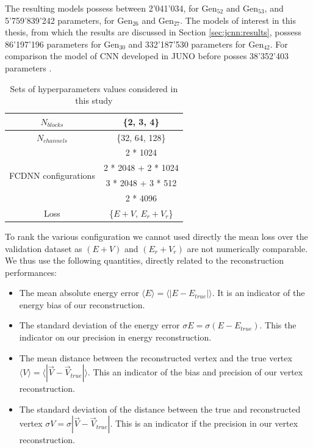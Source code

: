 \documentclass[../main.tex]{subfiles}
\begin{document}
\hfill

The resulting models possess between 2'041'034, for $\mathrm{Gen}_{52}$ and $\mathrm{Gen}_{53}$, and  5'759'839'242 parameters, for $\mathrm{Gen}_{26}$ and $\mathrm{Gen}_{27}$. The models of interest in this thesis, from which the results are discussed in Section \ref{sec:jcnn:results}, possess 86'197'196 parameters for $\mathrm{Gen}_{30}$ and 332'187'530 parameters for $\mathrm{Gen}_{42}$. For comparison the model of CNN developed in JUNO before posses 38'352'403 parameters \cite{qian_vertex_2021}.

\begin{table}[ht]
  \centering
  \begin{tabular}{ | c | c | }
    \hline $N_{blocks}$ & \{2, 3, 4\} \\
    \hline $N_{channels}$ & \{32, 64, 128\} \\
    \hline
    \multirow{4}{*}{FCDNN configurations} & 2 * 1024 \\
                                        & 2 * 2048 + 2 * 1024 \\
                                        & 3 * 2048 + 3 * 512 \\
                                        & 2 * 4096 \\
    \hline
    Loss & \{$E+V$, $E_r + V_r$\} \\
    \hline
  \end{tabular}
  \caption{Sets of hyperparameters values considered in this study}
  \label{tab:jcnn:hyper}
\end{table}


To rank the various configuration we cannot used directly the mean loss over the validation dataset as $(E+V)$ and $(E_r + V_r)$ are not numerically comparable. We thus use the following quantities, directly related to the reconstruction performances:
\begin{itemize}
  \item The mean absolute energy error $\langle E \rangle = \langle | E - E_{true} | \rangle$. It is an indicator of the energy bias of our reconstruction.
  \item The standard deviation of the energy error $\sigma E = \sigma (E - E_{true})$. This the indicator on our precision in energy reconstruction.
  \item The mean distance between the reconstructed vertex and the true vertex $\langle V \rangle = \langle | \vec{V} - \vec{V}_{true} | \rangle$. This an indicator of the bias and precision of our vertex reconstruction.
  \item The standard deviation of the distance between the true and reconstructed vertex $\sigma V = \sigma |\vec{V} - \vec{V}_{true}|$. This is an indicator if the precision in our vertex reconstruction.
\end{itemize}
\end{document}
